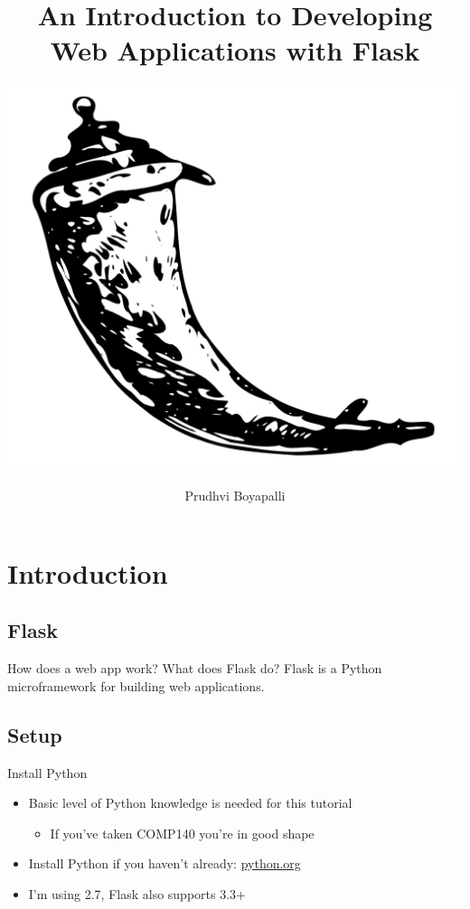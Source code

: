 \documentclass{beamer}
\title[]{An Introduction to Developing Web Applications with Flask}
\subtitle{\vspace{0.25in} \includegraphics[scale=.15]{images/flask-logo.png}}
\author[]{Prudhvi Boyapalli}
\institute{Hack \& Learn 2017 Workshop \\ Rice Computer Science Club}
\date{}
\begin{document}
\begin{frame}
	\titlepage
\end{frame}

\begin{frame}[t]{}
	\tableofcontents
\end{frame}

\section{Introduction}

\subsection{Flask}
	\begin{frame}[t]{How does a web app work? What does Flask do?}
		Flask is a Python microframework for building web applications.

		\begin{center}
		\end{center}
	\end{frame}


\subsection{Setup}
	\begin{frame}[t]{Install Python}
		\begin{itemize}
			\item{Basic level of Python knowledge is needed for this tutorial}
			\begin{itemize}
				\item{If you've taken COMP140 you're in good shape}
			\end{itemize}

			\item{Install Python if you haven't already: \url{python.org}}

			\item{I'm using 2.7, Flask also supports 3.3+}
		\end{itemize}
	\end{frame}
\end{document}

